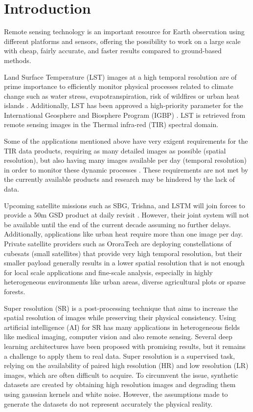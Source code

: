 \section{Introduction} \label{sec:intro}


Remote sensing technology is an important resource for Earth observation using different platforms
and sensors, offering the possibility to work on a large scale with cheap, fairly accurate, and faster results compared to ground-based methods.

Land Surface Temperature (LST) images at a high temporal resolution are of prime importance to efficiently monitor physical processes related to climate change such as water stress, evapotranspiration, risk of wildfires or urban heat islands \cite{lst2005}.
Additionally, LST has been approved a high-priority parameter for the International Geosphere and Biosphere Program (IGBP) \cite{townshend94}. LST is retrieved from remote sensing images in the Thermal infra-red (TIR) spectral domain. 

Some of the applications mentioned above have very exigent requirements for the TIR data products, requiring as many detailed images as possible (spatial resolution), but also having many images available per day (temporal resolution) in order to monitor these dynamic processes .
These requirements are not met by the currently available products and research may be hindered by the lack of data.

Upcoming satellite missions such as SBG, Trishna, and LSTM will join forces to provide a 50m GSD product at daily revisit \cite{author2023thermal}. However, their joint system will not be available until the end of the current decade assuming no further delays. Additionally, applications like urban heat require more than one image per day.
Private satellite providers such as OroraTech are deploying constellations of cubesats (small satellites) that provide very high temporal resolution, but their smaller payload generally results in a lower spatial resolution that is not enough for local scale applications and fine-scale analysis, especially in highly heterogeneous environments like urban areas, diverse agricultural plots or sparse forests.

Super resolution (SR) is a post-processing technique that aims to increase the spatial resolution of images while preserving their physical consistency.
Using artificial intelligence (AI) for SR has many applications in heterogeneous fields like medical imaging, computer vision and also remote sensing. Several deep learning architectures have been proposed with promising results, but it remains a challenge to apply them to real data. 
Super resolution is a supervised task, relying on the availability of paired high resolution (HR) and low resolution (LR) images, which are often difficult to acquire.
To circumvent the issue, synthetic datasets are created by obtaining high resolution images and degrading them using gaussian kernels and white noise. However, the assumptions made to generate the datasets do not represent accurately the physical reality.


